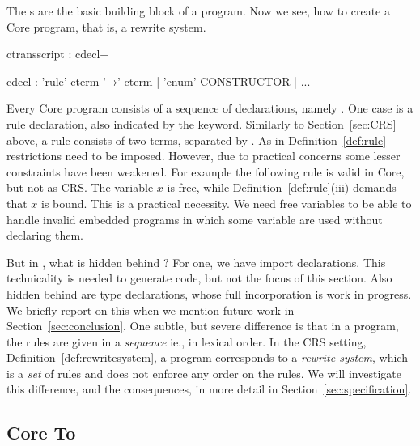 The s are the basic building block of a \Tosca
program. Now we see, how to create a \Tosca Core program, that
is, a rewrite system.
%
\begin{lstANTLR}
  ctransscript : cdecl+

  cdecl : 'rule' cterm '→' cterm
          | 'enum' CONSTRUCTOR
          | ...
\end{lstANTLR}
%

Every \Tosca Core program consists of a sequence of declarations,
namely . One case  is a rule
declaration, also indicated by the  keyword. Similarly
to Section~\ref{sec:CRS} above, a rule consists of two terms,
separated by . As in Definition~\ref{def:rule}
restrictions need to be imposed. However, due to practical concerns
some lesser constraints have been weakened. For example the following
\Tosca rule  is valid in \Tosca Core, but not as
CRS. The variable $x$ is free, while Definition~\ref{def:rule}(iii)
demands that $x$ is bound. This is a practical necessity. We need free
variables to be able to handle invalid embedded programs in which some
variable are used without declaring them.

But in , what is hidden behind  ? For one,
we have import declarations. This technicality is needed to generate
\java code, but not the focus of this section.  Also hidden behind
 are type declarations, whose full incorporation is work in
progress. We briefly report on this when we mention future work in
Section~\ref{sec:conclusion}.
%
One subtle, but severe difference is that in a \Tosca program,
the rules are given in a \emph{sequence} ie., in lexical order. In the CRS setting,
Definition~\ref{def:rewritesystem}, a program corresponds to a
\emph{rewrite system}, which is a \emph{set} of rules and does not
enforce any order on the rules. We will investigate this difference,
and the consequences, in more detail in
Section~\ref{sec:specification}.

\subsection{\Tosca Core To
  \Tosca} \label{sec:coretotransscript} 

